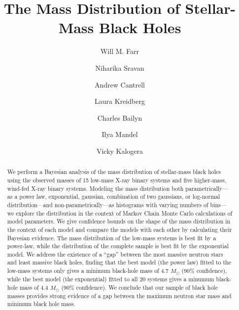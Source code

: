\documentclass[preprint]{aastex}
\newcommand{\Msun}{M_\odot}
\begin{document}
\title{The Mass Distribution of Stellar-Mass Black Holes}

\author{Will M. Farr \and Niharika Sravan} 



\author{Andrew Cantrell \and Laura Kreidberg \and Charles Bailyn}



\author{Ilya Mandel \and Vicky Kalogera} 



\begin{abstract}
  We perform a Bayesian analysis of the mass distribution of
  stellar-mass black holes using the observed masses of 15 low-mass
  X-ray binary systems and five higher-mass, wind-fed X-ray binary
  systems.  Modeling the mass distribution both parametrically---as a
  power law, exponential, gaussian, combination of two gaussians, or
  log-normal distribution---and non-parametrically---as histograms
  with varying numbers of bins---we explore the distribution in the
  context of Markov Chain Monte Carlo calculations of model
  parameters.  We give confidence bounds on the shape of the mass
  distribution in the context of each model and compare the models
  with each other by calculating their Bayesian evidence.  The mass
  distribution of the low-mass systems is best fit by a power-law,
  while the distribution of the complete sample is best fit by the
  exponential model.  We address the existence of a ``gap'' between
  the most massive neutron stars and least massive black holes,
  finding that the best model (the power law) fitted to the low-mass
  systems only gives a minimum black-hole mass of 4.7 $\Msun$ (90\%
  confidence), while the best model (the exponential) fitted to all 20
  systems gives a minumum black-hole mass of 4.4 $\Msun$ (90\%
  confidence).  We conclude that our sample of black hole masses
  provides strong evidence of a gap between the maximum neutron star
  mass and minimum black hole mass.
\end{abstract}
\end{document}
